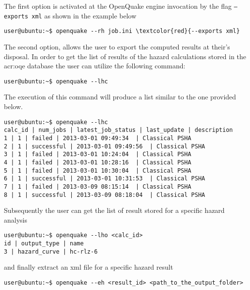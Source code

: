 The first option is activated at the OpenQuake engine invocation by 
the flag \texttt{--exports xml} as shown in the example below
\begin{Verbatim}[frame=single, commandchars=\\\{\}, fontsize=\small]
user@ubuntu:~$ openquake --rh job.ini \textcolor{red}{--exports xml}
\end{Verbatim}

The second option, allows the user to export the computed results at 
their's disposal.
In order to get the list of results of the hazard calculations stored 
in the \gls{acr:oqe} database the user can utilize the following command:
\begin{Verbatim}[frame=single, commandchars=\\\{\}, fontsize=\small]
user@ubuntu:~$ openquake --lhc
\end{Verbatim}
The execution of this command will produce a list similar to the 
one provided below.
\begin{Verbatim}[frame=single, commandchars=\\\{\}, fontsize=\small]
user@ubuntu:~$ openquake --lhc
calc_id | num_jobs | latest_job_status | last_update | description
1 | 1 | failed | 2013-03-01 09:49:34  | Classical PSHA
2 | 1 | successful | 2013-03-01 09:49:56  | Classical PSHA
3 | 1 | failed | 2013-03-01 10:24:04  | Classical PSHA
4 | 1 | failed | 2013-03-01 10:28:16  | Classical PSHA
5 | 1 | failed | 2013-03-01 10:30:04  | Classical PSHA
6 | 1 | successful | 2013-03-01 10:31:53  | Classical PSHA
7 | 1 | failed | 2013-03-09 08:15:14  | Classical PSHA
8 | 1 | successful | 2013-03-09 08:18:04  | Classical PSHA
\end{Verbatim}
Subsequently the user can get the list of result stored for a specific 
hazard analysis
\begin{Verbatim}[frame=single, commandchars=\\\{\}, fontsize=\small]
user@ubuntu:~$ openquake --lho <calc_id>
id | output_type | name
3 | hazard_curve | hc-rlz-6
\end{Verbatim}
and finally extract an xml file for a specific hazard result 
\begin{Verbatim}[frame=single, commandchars=\\\{\}, fontsize=\small]
user@ubuntu:~$ openquake --eh <result_id> <path_to_the_output_folder>
\end{Verbatim}

\clearpage


